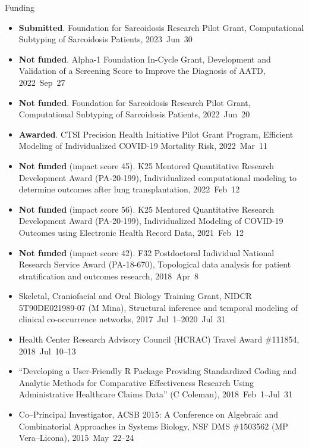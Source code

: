 \documentclass[10pt,a4paper]{article}
\begin{document}
\vspace{.25cm}
{\sc Funding}
\begin{itemize}[label=$\circ$,nolistsep]
\item
{\bfseries Submitted}. Foundation for Sarcoidosis Research Pilot Grant, Computational Subtyping of Sarcoidosis Patients, 2023~Jun~30
\item
{\bfseries Not funded}. Alpha-1 Foundation In-Cycle Grant, Development and Validation of a Screening Score to Improve the Diagnosis of AATD, 2022~Sep~27
\item
{\bfseries Not funded}. Foundation for Sarcoidosis Research Pilot Grant, Computational Subtyping of Sarcoidosis Patients, 2022~Jun~20
\item
{\bfseries Awarded}. CTSI Precision Health Initiative Pilot Grant Program, Efficient Modeling of Individualized COVID-19 Mortality Risk, 2022~Mar~11
\item
{\bfseries Not funded} (impact score 45). K25 Mentored Quantitative Research Development Award (PA-20-199), Individualized computational modeling to determine outcomes after lung transplantation, 2022~Feb~12
\item
{\bfseries Not funded} (impact score 56). K25 Mentored Quantitative Research Development Award (PA-20-199), Individualized Modeling of COVID-19 Outcomes using Electronic Health Record Data, 2021~Feb~12
\item
{\bfseries Not funded} (impact score 42). F32 Postdoctoral Individual National Research Service Award (PA-18-670), Topological data analysis for patient stratification and outcomes
research, 2018~Apr~8
\item
Skeletal, Craniofacial and Oral Biology Training Grant, NIDCR 5T90DE021989-07 (M Mina), Structural inference and temporal modeling of clinical co-occurrence networks, 2017~Jul~1--2020~Jul~31
\item
Health Center Research Advisory Council (HCRAC) Travel Award \#111854, 2018~Jul~10--13
\item
``Developing a User-Friendly R Package Providing Standardized Coding and Analytic Methods for Comparative Effectiveness Research Using Administrative Healthcare Claims Data'' (C Coleman), 2018~Feb~1--Jul~31
\item
Co--Principal Investigator, ACSB 2015: A Conference on Algebraic and Combinatorial Approaches in Systems Biology, NSF DMS \#1503562 (MP Vera--Licona), 2015~May~22--24
\end{itemize}
\end{document}
